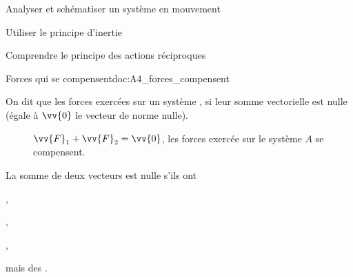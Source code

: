 \teteSndMouv

\nomPrenomClasse






\begin{objectifs}
  \item Analyser et schématiser un système en mouvement
  \item Utiliser le principe d'inertie
  \item Comprendre le principe des actions réciproques
\end{objectifs}


\begin{doc}{Forces qui se compensent}{doc:A4_forces_compensent}
  \begin{importants}
    On dit que les forces exercées sur un système , si leur somme vectorielle est nulle (égale à $\vv{0}$ le vecteur de norme nulle).
    
    \begin{wrapfigure}{r}{0.4\linewidth}
      \vspace*{-40pt}
      \begin{center}
      
        $\vv{F}_1 + \vv{F}_2 = \vv{0}$, les forces exercée sur le système $A$ se compensent.
      \end{center}
    \end{wrapfigure}
    
    La somme de deux vecteurs est nulle s'ils ont
    
    \begin{listePoints}
      \item {},
      \item {},
      \item {},
      \item mais des .
    \end{listePoints}
  \end{importants}
\end{doc}



